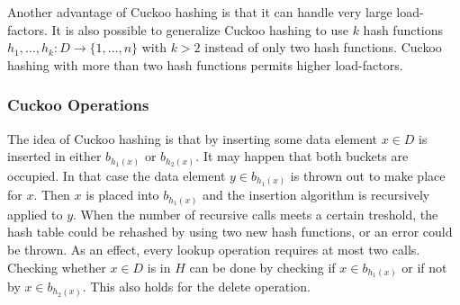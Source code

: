 Another advantage of Cuckoo hashing is that it can handle very large load-factors. It is also possible to generalize Cuckoo hashing to use $k$ hash functions $h_1, \dots, h_k : D \rightarrow \{ 1, \dots, n \}$ with $k > 2$ instead of only two hash functions. Cuckoo hashing with more than two hash functions permits higher load-factors.

\subsubsection{Cuckoo Operations}
The idea of Cuckoo hashing is that by inserting some data element $x \in D$ is inserted in either $b_{h_1(x)}$ or $b_{h_2(x)}$. It may happen that both buckets are occupied. In that case the data element $y \in b_{h_1(x)}$ is thrown out to make place for $x$. Then $x$ is placed into $b_{h_1(x)}$ and the insertion algorithm is recursively applied to $y$. When the number of recursive calls meets a certain treshold, the hash table could be rehashed by using two new hash functions, or an error could be thrown. As an effect, every lookup operation requires at most two calls. Checking whether $x \in D$ is in $H$ can be done by checking if $x \in b_{h_1(x)}$ or if not by $x \in b_{h_2(x)}$. This also holds for the delete operation.

